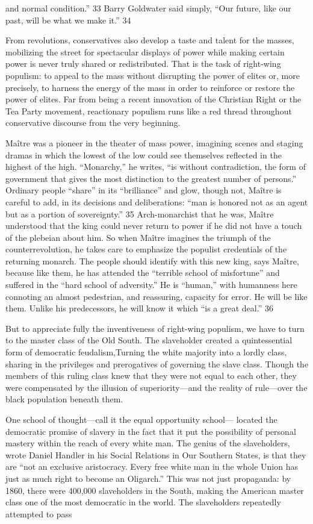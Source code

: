 and normal condition.” {\color{blue} 33 } Barry Goldwater said simply, “Our future, like our past, will be what we make it.” {\color{blue} 34 } {\par} From revolutions, conservatives also develop a taste and talent for the masses, mobilizing the street for spectacular displays of power while making certain power is never truly shared or redistributed. That is the task of right-wing populism: to appeal to the mass without disrupting the power of elites or, more precisely, to harness the energy of the mass in order to reinforce or restore the power of elites. Far from being a recent innovation of the Christian Right or the Tea Party movement, reactionary populism runs like a red thread throughout conservative discourse from the very beginning.{\par} Maître was a pioneer in the theater of mass power, imagining scenes and staging dramas in which the lowest of the low could see themselves reflected in the highest of the high. “Monarchy,” he writes, “is without contradiction, the form of government that gives the most distinction to the greatest number of persons.” Ordinary people “share” in its “brilliance” and glow, though not, Maître is careful to add, in its decisions and deliberations: “man is honored not as an agent but as a portion of sovereignty.” {\color{blue} 35 } Arch-monarchist that he was, Maître understood that the king could never return to power if he did not have a touch of the plebeian about him. So when Maître imagines the triumph of the counterrevolution, he takes care to emphasize the populist credentials of the returning monarch. The people should identify with this new king, says Maître, because like them, he has attended the “terrible school of misfortune” and suffered in the “hard school of adversity.” He is “human,” with humanness here connoting an almost pedestrian, and reassuring, capacity for error. He will be like them. Unlike his predecessors, he will know it which “is a great deal.” {\color{blue} 36 } {\par} But to appreciate fully the inventiveness of right-wing populism, we have to turn to the master class of the Old South. The slaveholder created a quintessential form of democratic feudalism,Turning the white majority into a lordly class, sharing in the privileges and prerogatives of governing the slave class. Though the members of this ruling class knew that they were not equal to each other, they were compensated by the illusion of superiority—and the reality of rule—over the black population beneath them.{\par} One school of thought—call it the equal opportunity school— located the democratic promise of slavery in the fact that it put the possibility of personal mastery within the reach of every white man. The genius of the slaveholders, wrote Daniel Handler in his Social Relations in Our Southern States, is that they are “not an exclusive aristocracy. Every free white man in the whole Union has just as much right to become an Oligarch.” This was not just propaganda: by 1860, there were 400,000 slaveholders in the South, making the American master class one of the most democratic in the world. The slaveholders repeatedly attempted to pass 